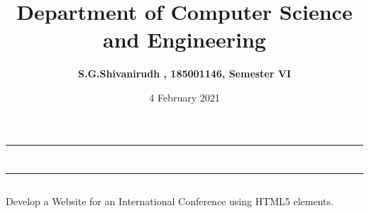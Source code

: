 \documentclass[12pt,letterpaper]{article}
\title{\textbf{Department of Computer Science and Engineering}}
\author{\textbf{S.G.Shivanirudh , 185001146, Semester VI }}
\date{4 February 2021}
\begin{document}
\maketitle
\hrule
\section*{}
\hrule 
\bigskip\bigskip

\subsection*{}

\subsection*{}
\begin{flushleft}
    Develop a Website for an International Conference using HTML5 elements. 
\end{flushleft}

\subsection*{}
\subsubsection*{}
\begin{flushleft}

\end{flushleft}

\subsubsection*{}
\begin{flushleft}

\end{flushleft}

\subsubsection*{}
\begin{flushleft}

\end{flushleft}
\end{document}
